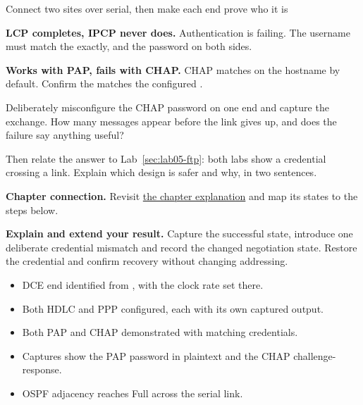 \begin{labproject}{Connect two sites over serial, then make each end prove who it is}
\begin{troubleshoot}
\textbf{LCP completes, IPCP never does.} Authentication is failing. The username must match the  exactly, and the password on both sides.

\textbf{Works with PAP, fails with CHAP.} CHAP matches on the hostname by default. Confirm the  matches the configured .
\end{troubleshoot}

\begin{tryit}
Deliberately misconfigure the CHAP password on one end and capture the exchange. How many messages appear before the link gives up, and does the failure say anything useful?

Then relate the answer to Lab~\ref{sec:lab05-ftp}: both labs show a credential crossing a link. Explain which design is safer and why, in two sentences.
\end{tryit}
\end{labproject}

\textbf{Chapter connection.} Revisit \hyperref[ch:wan]{the chapter explanation} and map its states to the steps below.


\begin{verification}
\textbf{Explain and extend your result.} Capture the successful state, introduce one deliberate credential mismatch and record the changed negotiation state. Restore the credential and confirm recovery without changing addressing.


\begin{itemize}
  \item DCE end identified from , with the clock rate set there.
  \item Both HDLC and PPP configured, each with its own captured output.
  \item Both PAP and CHAP demonstrated with matching credentials.
  \item Captures show the PAP password in plaintext and the CHAP challenge-response.
  \item OSPF adjacency reaches Full across the serial link.
\end{itemize}
\end{verification}
